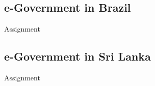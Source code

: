 \subsection{e-Government in Brazil}
Assignment

\subsection{e-Government in  Sri Lanka}
Assignment

%
%
%
%
